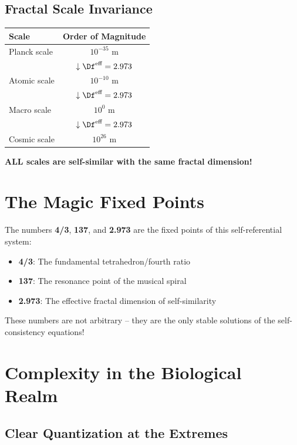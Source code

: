 	\subsection{Fractal Scale Invariance}
	
	\begin{center}
		\begin{tabular}{lc}
			\toprule
			Scale & Order of Magnitude\\
			\midrule
			Planck scale & $10^{-35}$ m\\
			& $\downarrow \Df^{\text{eff}} = 2.973$\\
			Atomic scale & $10^{-10}$ m\\
			& $\downarrow \Df^{\text{eff}} = 2.973$\\
			Macro scale & $10^0$ m\\
			& $\downarrow \Df^{\text{eff}} = 2.973$\\
			Cosmic scale & $10^{26}$ m\\
			\bottomrule
		\end{tabular}
	\end{center}
	
	\textbf{ALL scales are self-similar with the same fractal dimension!}
	
	\section{The Magic Fixed Points}
	
	The numbers \textbf{4/3}, \textbf{137}, and \textbf{2.973} are the fixed points of this self-referential system:
	
	\begin{itemize}
		\item \textbf{4/3}: The fundamental tetrahedron/fourth ratio
		\item \textbf{137}: The resonance point of the musical spiral
		\item \textbf{2.973}: The effective fractal dimension of self-similarity
	\end{itemize}
	
	These numbers are not arbitrary -- they are the only stable solutions of the self-consistency equations!
	
	\section{Complexity in the Biological Realm}
	
	\subsection{Clear Quantization at the Extremes}
	
